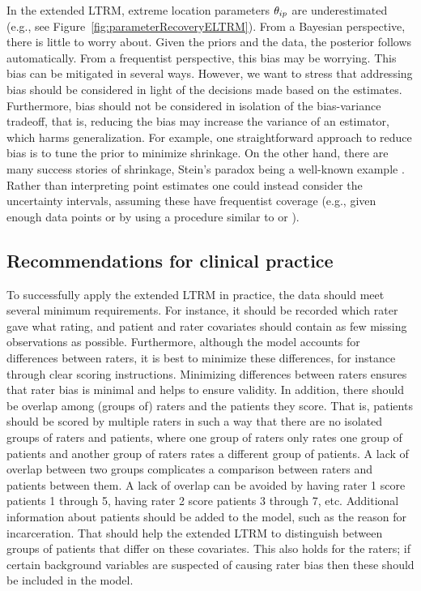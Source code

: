 \documentclass[a4paper,usenames,dvipsnames]{article}
\newenvironment{revision}{\color{teal}}{\color{black}}
\begin{document}
\begin{revision}
In the extended LTRM, extreme location parameters $\theta_{ip}$ are underestimated (e.g., see Figure~\ref{fig:parameterRecoveryELTRM}).
From a Bayesian perspective, there is little to worry about. Given the priors and the data, the posterior follows automatically.
From a frequentist perspective, this bias may be worrying.
This bias can be mitigated in several ways.
However, we want to stress that addressing bias should be considered in light of the decisions made based on the estimates.
Furthermore, bias should not be considered in isolation of the bias-variance tradeoff, that is, reducing the bias may increase the variance of an estimator, which harms generalization. 
For example, one straightforward approach to reduce bias is to tune the prior to minimize shrinkage. On the other hand, there are many success stories of shrinkage, Stein’s paradox being a well-known example \cite{EfronMorris1977}.
Rather than interpreting point estimates one could instead consider the uncertainty intervals, assuming these have frequentist coverage (e.g., given enough data points or by using a procedure similar to  or ).
\end{revision}

\subsection*{Recommendations for clinical practice}
To successfully apply the extended LTRM in practice, the data should meet several minimum requirements. 
\begin{revision}%
For instance, it should be recorded which rater gave what rating, and patient and rater covariates should contain as few missing observations as possible.
\end{revision}%
\begin{revision}Furthermore, \end{revision}although the model accounts for differences between raters, it is best to minimize these differences, for instance through clear scoring instructions. Minimizing differences between raters ensures that rater bias is minimal and helps to ensure validity. In addition, there should be overlap among (groups of) raters and the patients they score. That is, patients should be scored by multiple raters in such a way that there are no isolated groups of raters and patients, where one group of raters only rates one group of patients and another group of raters rates a different group of patients. A lack of overlap between two groups complicates a comparison between raters and patients between them. A lack of overlap can be avoided by having rater 1 score patients 1 through 5, having rater 2 score patients 3 through 7, etc. Additional information about patients should be added to the model, such as the reason for incarceration. That should help the extended LTRM to distinguish between groups of patients that differ on these covariates. This also holds for the raters; if certain background variables are suspected of causing rater bias then these should be included in the model.
\end{document}
